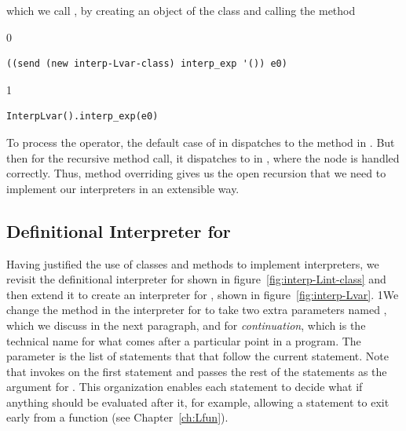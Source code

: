 \documentclass[7x10]{TimesAPriori_MIT}%
\def\racketEd{0}
\def\pythonEd{1}
\def\edition{1}
\newcommand{\pythonColor}[0]{}
\newcommand{\python}[1]{{\if\edition\pythonEd\pythonColor #1\fi}}
\numberwithin{theorem}{chapter}
\numberwithin{definition}{chapter}
\numberwithin{equation}{chapter}
\begin{document}
%
which we call , by creating an object of the \LangVar{} class
and calling the  method
{\if\edition\racketEd
\begin{lstlisting}
((send (new interp-Lvar-class) interp_exp '()) e0)
\end{lstlisting}
\fi}
{\if\edition\pythonEd\pythonColor
\begin{lstlisting}
InterpLvar().interp_exp(e0)
\end{lstlisting}
\fi}
\noindent To process the \code{-} operator, the default case of
 in \LangVar{} dispatches to the 
method in \LangInt{}. But then for the recursive method call, it
dispatches to  in \LangVar{}, where the
 node is handled correctly. Thus, method overriding gives us
the open recursion that we need to implement our interpreters in an
extensible way.


\subsection{Definitional Interpreter for \LangVar{}}
\label{sec:interp-Lvar}

Having justified the use of classes and methods to implement
interpreters, we revisit the definitional interpreter for \LangInt{}
shown in figure~\ref{fig:interp-Lint-class} and then extend it to
create an interpreter for \LangVar{}, shown in
figure~\ref{fig:interp-Lvar}.
%
\python{We change the  method in the interpreter
  for \LangInt{} to take two extra parameters named \code{env}, which
  we discuss in the next paragraph, and \code{cont} for
  \emph{continuation}, which is the technical name for what comes
  after a particular point in a program. The \code{cont} parameter is
  the list of statements that that follow the current statement.  Note
  that \code{interp\_stmts} invokes \code{interp\_stmt} on the first
  statement and passes the rest of the statements as the argument for
  \code{cont}. This organization enables each statement to decide what
  if anything should be evaluated after it, for example, allowing a
  \code{return} statement to exit early from a function (see
  Chapter~\ref{ch:Lfun}).}
\end{document}
